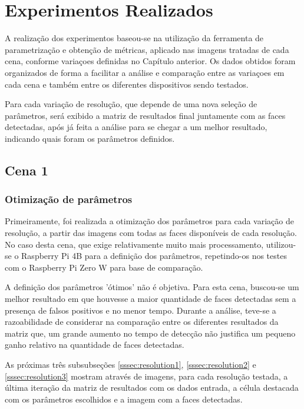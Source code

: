 \chapter{Experimentos Realizados}
\thispagestyle{plain}
\label{cap:experimentos}
\graphicspath{{./Cap4_Experimentos_Realizados/Figures/}}

A realização dos experimentos baseou-se na utilização da ferramenta de parametrização e obtenção de métricas, aplicado nas imagens tratadas de cada cena, conforme variaçoes definidas no Capítulo anterior. Os dados obtidos foram organizados de forma a facilitar a análise e comparação entre as variaçoes em cada cena e também entre os diferentes dispositivos sendo testados.

Para cada variação de resolução, que depende de uma nova seleção de parâmetros, será exibido a matriz de resultados final juntamente com as faces detectadas, após já feita a análise para se chegar a um melhor resultado, indicando quais foram os parâmetros definidos.

\section{Cena 1}

\subsection{Otimização de parâmetros}

Primeiramente, foi realizada a otimização dos parâmetros para cada variação de resolução, a partir das imagens com todas as faces disponíveis de cada resolução. No caso desta cena, que exige relativamente muito mais processamento, utilizou-se o Raspberry Pi 4B para a definição dos parâmetros, repetindo-os nos testes com o Raspberry Pi Zero W para base de comparação.

A definição dos parâmetros 'ótimos' não é objetiva. Para esta cena, buscou-se um melhor resultado em que houvesse a maior quantidade de faces detectadas sem a presença de falsos positivos e no menor tempo. Durante a análise, teve-se a razoabilidade de considerar na comparação entre os diferentes resultados da matriz que, um grande aumento no tempo de detecção não justifica um pequeno ganho relativo na quantidade de faces detectadas.

As próximas três subsubseções \ref{sssec:resolution1}, \ref{sssec:resolution2} e \ref{sssec:resolution3} mostram através de imagens, para cada resolução testada, a última iteração da matriz de resultados com os dados entrada, a célula destacada com os parâmetros escolhidos e a imagem com a faces detectadas.

